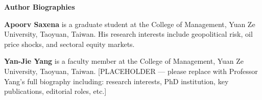 \documentclass[12pt]{article}
\begin{document}
\noindent\textbf{Author Biographies}

\bigskip

\noindent\textbf{Apoorv Saxena} is a graduate student at the College of Management, Yuan Ze University, Taoyuan, Taiwan. His research interests include geopolitical risk, oil price shocks, and sectoral equity markets.

\bigskip

\noindent\textbf{Yan-Jie Yang} is a faculty member at the College of Management, Yuan Ze University, Taoyuan, Taiwan. [PLACEHOLDER — please replace with Professor Yang's full biography including: research interests, PhD institution, key publications, editorial roles, etc.]
\end{document}

